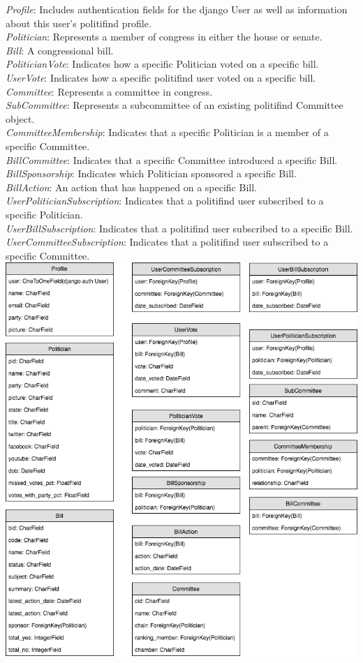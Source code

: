 \documentclass{article}
\newcommand{\n}{\noindent}
\begin{document}
\n\textit{Profile}: Includes authentication fields for the django User as well as information about this user's politifind profile. \\
\n\textit{Politician}: Represents a member of congress in either the house or senate. \\
\n\textit{Bill}: A congressional bill.\\
\n\textit{PoliticianVote}: Indicates how a specific Politician voted on a specific bill. \\
\n\textit{UserVote}: Indicates how a specific politifind user voted on a specific bill.\\
\n\textit{Committee}: Represents a committee in congress. \\
\n\textit{SubCommittee}: Represents a subcommittee of an existing politifind Committee object. \\
\n\textit{CommitteeMembership}: Indicates that a specific Politician is a member of a specific Committee. \\
\n\textit{BillCommittee}: Indicates that a specific Committee introduced a specific Bill. \\
\n\textit{BillSponsorship}: Indicates which Politician sponsored a specific Bill. \\
\n\textit{BillAction}: An action that has happened on a specific Bill. \\
\n\textit{UserPoliticianSubscription}: Indicates that a politifind user subscribed to a specific Politician. \\
\n\textit{UserBillSubscription}: Indicates that a politifind user subscribed to a specific Bill.\\
\n\textit{UserCommitteeSubscription}: Indicates that a politifind user subscribed to a specific Committee.\\

\includegraphics[scale=0.5]{politifind-data-model-UPDATED.png} \\
\end{document}
